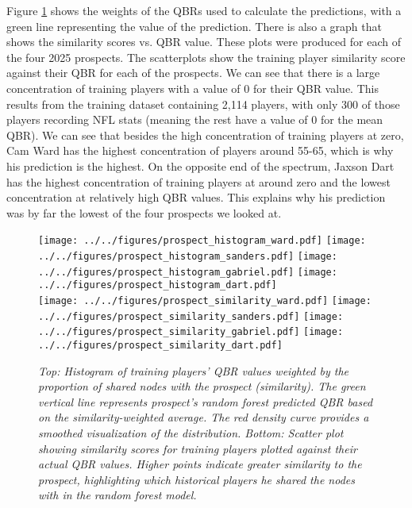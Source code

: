 \documentclass{article}
\begin{document}
Figure \ref{fig:prospect-plots} shows the weights of the QBRs used to calculate the predictions, with a green line representing the value of the prediction. There is also a graph that shows the similarity scores vs. QBR value. These plots were produced for each of the four 2025 prospects. The scatterplots show the training player similarity score against their QBR for each of the prospects. We can see that there is a large concentration of training players with a value of 0 for their QBR value. This results from the training dataset containing 2,114 players, with only 300 of those players recording NFL stats (meaning the rest have a value of 0 for the mean QBR). We can see that besides the high concentration of training players at zero, Cam Ward has the highest concentration of players around 55-65, which is why his prediction is the highest. On the opposite end of the spectrum, Jaxson Dart has the highest concentration of training players at around zero and the lowest concentration at relatively high QBR values. This explains why his prediction was by far the lowest of the four prospects we looked at.

\begin{figure}[H]
    \centering
    \texttt{[image: ../../figures/prospect\_histogram\_ward.pdf]}
    \texttt{[image: ../../figures/prospect\_histogram\_sanders.pdf]}
    \texttt{[image: ../../figures/prospect\_histogram\_gabriel.pdf]}
    \texttt{[image: ../../figures/prospect\_histogram\_dart.pdf]} \\
    \texttt{[image: ../../figures/prospect\_similarity\_ward.pdf]}
    \texttt{[image: ../../figures/prospect\_similarity\_sanders.pdf]}
    \texttt{[image: ../../figures/prospect\_similarity\_gabriel.pdf]}
    \texttt{[image: ../../figures/prospect\_similarity\_dart.pdf]}
    \caption{\textit{Top: Histogram of training players’ QBR values weighted by the proportion of shared nodes with the prospect (similarity). The green vertical line represents prospect’s random forest predicted QBR based on the similarity-weighted average. The red density curve provides a smoothed visualization of the distribution.
    Bottom: Scatter plot showing similarity scores for training players plotted against their actual QBR values. Higher points indicate greater similarity to the prospect, highlighting which historical players he shared the nodes with in the random forest model.}}
    \label{fig:prospect-plots}
\end{figure}
\end{document}
